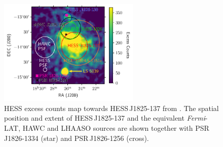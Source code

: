 \begin{figure}
    \centering
    \includegraphics[width=0.6\textwidth]{04_Introduction/Images/pulsar_wind_nebula/hess_j1825_image.pdf}
    \caption{HESS excess counts map towards \mbox{HESS\,J1825-137} from \cite{2019A&A...621A.116H}. The spatial position and extent of \mbox{HESS\,J1825-137} and the equivalent \textit{Fermi}-LAT, HAWC and LHAASO sources are shown together with PSR\,J1826-1334 (star) and PSR\,J1826-1256 (cross).}
    \label{fig:chapter1_hess_j1825_137_object_positions}
\end{figure}


